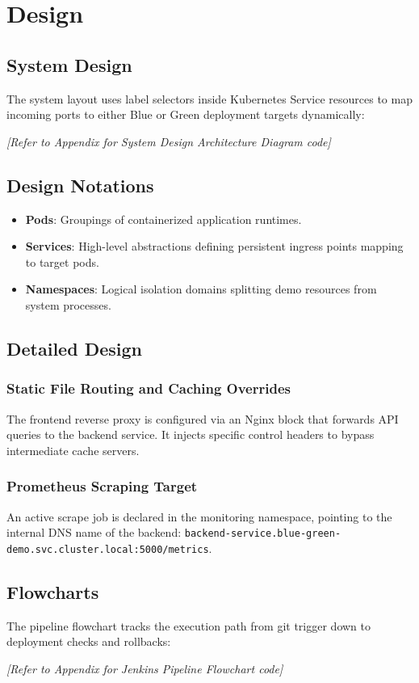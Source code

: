 \documentclass[12pt,a4paper]{article}
\begin{document}
\section{Design}
\subsection{System Design}
The system layout uses label selectors inside Kubernetes Service resources to map incoming ports to either Blue or Green deployment targets dynamically:
\begin{center}
    \textit{[Refer to Appendix for System Design Architecture Diagram code]}
\end{center}

\subsection{Design Notations}
\begin{itemize}
    \item \textbf{Pods}: Groupings of containerized application runtimes.
    \item \textbf{Services}: High-level abstractions defining persistent ingress points mapping to target pods.
    \item \textbf{Namespaces}: Logical isolation domains splitting demo resources from system processes.
\end{itemize}

\subsection{Detailed Design}
\subsubsection{Static File Routing and Caching Overrides}
The frontend reverse proxy is configured via an Nginx block that forwards API queries to the backend service. It injects specific control headers to bypass intermediate cache servers.
\subsubsection{Prometheus Scraping Target}
An active scrape job is declared in the monitoring namespace, pointing to the internal DNS name of the backend: \texttt{backend-service.blue-green-demo.svc.cluster.local:5000/metrics}.

\subsection{Flowcharts}
The pipeline flowchart tracks the execution path from git trigger down to deployment checks and rollbacks:
\begin{center}
    \textit{[Refer to Appendix for Jenkins Pipeline Flowchart code]}
\end{center}
\end{document}
